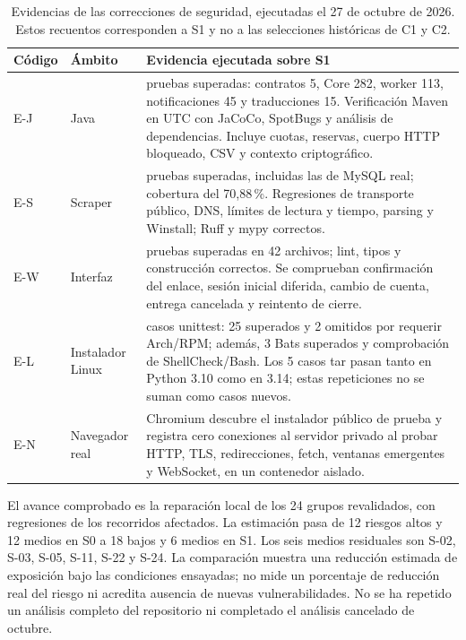 \endgroup

\begin{table}[H]
	\centering\small
	\begin{tabularx}{\textwidth}{@{}p{}>{\raggedright\arraybackslash}p{}>{\raggedright\arraybackslash}X@{}}
		\toprule
		\textbf{Código} & \textbf{Ámbito} & \textbf{Evidencia ejecutada sobre S1}\\
		\midrule
		E-J & Java & 460 pruebas superadas: contratos 5, Core 282, worker 113, notificaciones 45 y traducciones 15. Verificación Maven en UTC con JaCoCo, SpotBugs y análisis de dependencias. Incluye cuotas, reservas, cuerpo HTTP bloqueado, CSV y contexto criptográfico.\\
		E-S & Scraper & 395 pruebas superadas, incluidas las de MySQL real; cobertura del 70,88\,\%. Regresiones de transporte público, DNS, límites de lectura y tiempo, parsing y Winstall; Ruff y mypy correctos.\\
		E-W & Interfaz & 289 pruebas superadas en 42 archivos; lint, tipos y construcción correctos. Se comprueban confirmación del enlace, sesión inicial diferida, cambio de cuenta, entrega cancelada y reintento de cierre.\\
		E-L & Instalador Linux & 27 casos unittest: 25 superados y 2 omitidos por requerir Arch/RPM; además, 3 Bats superados y comprobación de ShellCheck/Bash. Los 5 casos tar pasan tanto en Python 3.10 como en 3.14; estas repeticiones no se suman como casos nuevos.\\
		E-N & Navegador real & Chromium descubre el instalador público de prueba y registra cero conexiones al servidor privado al probar HTTP, TLS, redirecciones, fetch, ventanas emergentes y WebSocket, en un contenedor aislado.\\
		\bottomrule
	\end{tabularx}
	\caption{Evidencias de las correcciones de seguridad, ejecutadas el 27 de octubre de 2026. Estos recuentos corresponden a S1 y no a las selecciones históricas de C1 y C2.}
	\label{tabla:evidencia-seguridad-s1}
\end{table}

El avance comprobado es la reparación local de los 24 grupos revalidados, con regresiones de los recorridos afectados. La estimación pasa de 12 riesgos altos y 12 medios en S0 a 18 bajos y 6 medios en S1. Los seis medios residuales son S-02, S-03, S-05, S-11, S-22 y S-24. La comparación muestra una reducción estimada de exposición bajo las condiciones ensayadas; no mide un porcentaje de reducción real del riesgo ni acredita ausencia de nuevas vulnerabilidades. No se ha repetido un análisis completo del repositorio ni completado el análisis cancelado de octubre.

